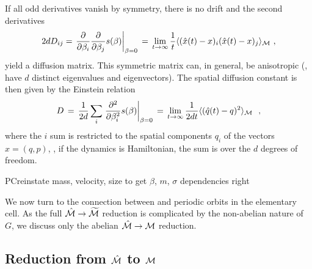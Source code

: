 If all odd derivatives vanish by symmetry,
there is no drift
and the second derivatives
\[
2d D_{ij} =
\left . {{\partial} \over {\partial \beta_i}}
{{\partial} \over {\partial \beta_j}}
s(\beta)\right |_{\beta=0} \,=\,\lim_{t\rightarrow \infty} {1\over t}
\langle {(\hat x(t) -x)_i (\hat x(t) -x)_j } \rangle_{{\cal M}} ~,
\] %
yield a diffusion matrix.
This symmetric matrix can, in general, be anisotropic
(\ie, have $d$ distinct eigenvalues and eigen\-vectors).
The spatial diffusion constant is then given by the Einstein
relation 
\[
D\,=\,{1\over 2 d} \sum_i
\left .{{\partial}^2 \over {\partial \beta^2_i}}
s(\beta)\right |_{\beta=0}
\,=\, \lim_{t\rightarrow \infty} {1\over{2d t}}
\langle {(\hat{q}(t) -q)^2 } \rangle_{{\cal M}}~
~,
\] %
where the $i$ sum is restricted to the spatial components $q_i$ of
the {\statesp} vectors $x=(q,p)$, \ie, if the dynamics is Hamiltonian,
the sum is over
the $d$ degrees of freedom.

PC{reinstate mass, velocity, size to get $\beta$, $m$, $\sigma$
    dependencies right}

We now turn to the connection between  and periodic orbits
in the elementary cell.
As the full $\hat {{\cal M}} \rightarrow {\widetilde {\ensuremath{{\cal M}}}}$ reduction is complicated by
the non-abelian nature of $G$, we discuss only
the abelian $\hat {{\cal M}} \rightarrow {\cal M}$ reduction.


\subsection{Reduction from $\hat {{\cal M}}$ to ${\cal M}$}
\label{s-Red-hMto-pS}

